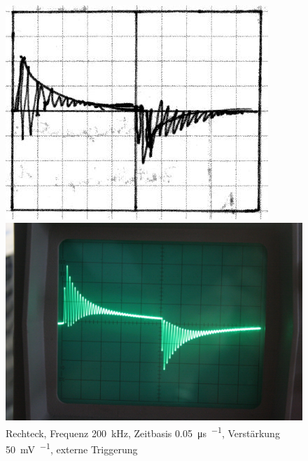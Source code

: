 \begin{figure}[htbp]
	\centering
	\begin{minipage}{.45\linewidth}
	\includegraphics[width=\linewidth]{Skizzen/IMG_0763-1500.jpg}
	\end{minipage}
	\hfill
	\begin{minipage}{.45\linewidth}
	\includegraphics[width=\linewidth]{Fotos/IMG_0763-1500.jpg}
	\end{minipage}
	\caption{%
		Rechteck, Frequenz \SI{200}{\kilo\hertz},
		Zeitbasis \SI{.05}{\micro\second\per\division},
		Verstärkung \SI{50}{\milli\volt\per\division},
		externe Triggerung
	}
	\label{fig:0763}
\end{figure}

